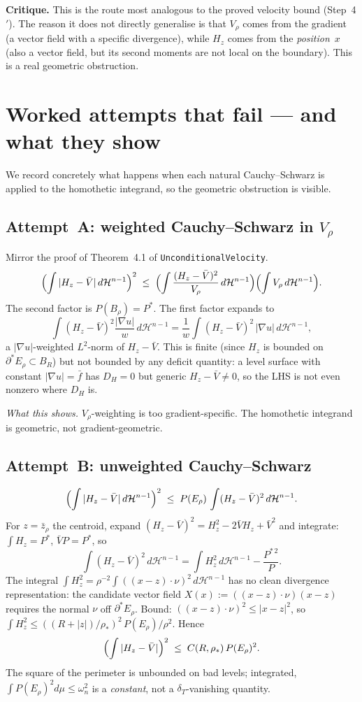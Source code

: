 \documentclass[11pt]{article}
\theoremstyle{definition}
\newcommand{\rstar}{\rho_{*}}
\newcommand{\Hn}{\mathcal H^{n-1}}
\begin{document}
\textbf{Critique.}  This is the route most analogous to the proved
velocity bound (Step~4$'$).  The reason it does not directly
generalise is that $V_{\rho}$ comes from the gradient (a vector
field with a specific divergence), while $H_{z}$ comes from the
\emph{position}~$x$ (also a vector field, but its second moments
are not local on the boundary).  This is a real geometric obstruction.

\section{Worked attempts that fail — and what they show}\label{sec:failed-attempts}

We record concretely what happens when each natural Cauchy--Schwarz is
applied to the homothetic integrand, so the geometric obstruction is
visible.

\subsection{Attempt~A: weighted Cauchy--Schwarz in $V_\rho$}

Mirror the proof of Theorem~4.1 of \texttt{UnconditionalVelocity}.
\[
   \Bigl(\int|H_{z}-\bar V|\,d\Hn\Bigr)^{2}
   \;\le\;\Bigl(\int\frac{(H_{z}-\bar V)^{2}}{V_{\rho}}\,d\Hn\Bigr)\Bigl(\int V_{\rho}\,d\Hn\Bigr).
\]
The second factor is $P(B_\rho)=P^{*}$. The first factor expands to
\[
   \int(H_{z}-\bar V)^{2}\frac{|\nabla u|}{w}\,d\Hn
   =\frac{1}{w}\int(H_{z}-\bar V)^{2}\,|\nabla u|\,d\Hn,
\]
a $|\nabla u|$-weighted $L^{2}$-norm of $H_{z}-\bar V$.  This is
finite (since $H_{z}$ is bounded on $\partial^{*}E_{\rho}\subset B_{R}$)
but not bounded by any deficit quantity: a level surface with constant
$|\nabla u|=\bar f$ has $D_{H}=0$ but generic $H_{z}-\bar V\ne 0$, so
the LHS is not even nonzero where $D_{H}$ is.

\emph{What this shows.}  $V_{\rho}$-weighting is too gradient-specific.
The homothetic integrand is geometric, not gradient-geometric.

\subsection{Attempt~B: unweighted Cauchy--Schwarz}

\[
   \Bigl(\int|H_{z}-\bar V|\,d\Hn\Bigr)^{2}
   \;\le\; P(E_{\rho})\,\int(H_{z}-\bar V)^{2}\,d\Hn.
\]
For $z=\bar z_{\rho}$ the centroid, expand
$(H_{z}-\bar V)^{2}=H_{z}^{2}-2\bar V H_{z}+\bar V^{2}$ and integrate:
$\int H_{z}=P^{*}$, $\bar V P=P^{*}$, so
\[
   \int(H_{z}-\bar V)^{2}\,d\Hn
   =\int H_{z}^{2}\,d\Hn-\frac{P^{*\,2}}{P}.
\]
The integral $\int H_{z}^{2}=\rho^{-2}\int((x-z)\cdot\nu)^{2}\,d\Hn$
has no clean divergence representation: the candidate vector field
$X(x):=((x-z)\cdot\nu)(x-z)$ requires the normal $\nu$ off
$\partial^{*}E_{\rho}$.  Bound:
$((x-z)\cdot\nu)^{2}\le|x-z|^{2}$, so
$\int H_{z}^{2}\le ((R+|z|)/\rstar)^{2}\,P(E_{\rho})/\rho^{2}$.  Hence
\[
   \Bigl(\int|H_{z}-\bar V|\Bigr)^{2}
   \;\le\;C(R,\rstar)\,P(E_{\rho})^{2}.
\]
The square of the perimeter is unbounded on bad levels; integrated,
$\int P(E_{\rho})^{2}d\mu\le\omega_{n}^{2}$ is a \emph{constant}, not a
$\delta_{T}$-vanishing quantity.
\end{document}
